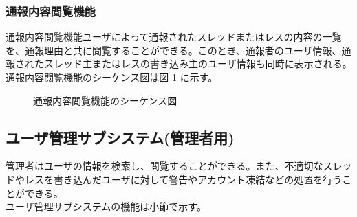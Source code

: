\documentclass[a4j]{jarticle}
\begin{document}
  \subsubsection{通報内容閲覧機能}
  通報内容閲覧機能ユーザによって通報されたスレッドまたはレスの内容の一覧を、通報理由と共に閲覧することができる。このとき、通報者のユーザ情報、通報されたスレッド主またはレスの書き込み主のユーザ情報も同時に表示される。通報内容閲覧機能のシーケンス図は図 \ref{fig:admin_bbs_report-reading.png} に示す。
  \begin{figure}[H]
    \centering
    \caption{通報内容閲覧機能のシーケンス図}
    \label{fig:admin_bbs_report-reading.png}
  \end{figure}
  \subsection{ユーザ管理サブシステム(管理者用)}
  管理者はユーザの情報を検索し、閲覧することができる。また、不適切なスレッドやレスを書き込んだユーザに対して警告やアカウント凍結などの処置を行うことができる。\\
  ユーザ管理サブシステムの機能は小節で示す。
\end{document}
